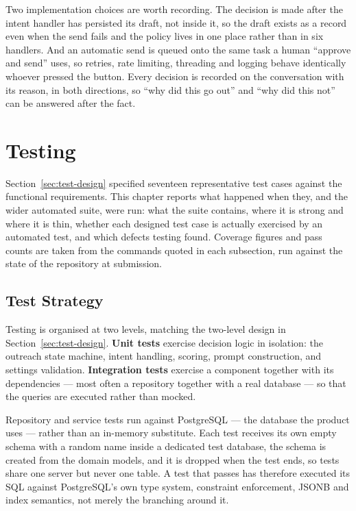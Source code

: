 \documentclass[a4paper]{article}
\begin{document}
Two implementation choices are worth recording. The decision is made after the
intent handler has persisted its draft, not inside it, so the draft exists as a
record even when the send fails and the policy lives in one place rather than
in six handlers. And an automatic send is queued onto the same task a human
``approve and send'' uses, so retries, rate limiting, threading and logging
behave identically whoever pressed the button. Every decision is recorded on
the conversation with its reason, in both directions, so ``why did this go
out'' and ``why did this not'' can be answered after the fact.

\newpage
\section{Testing}
\label{ch:testing}

Section~\ref{sec:test-design} specified seventeen representative test cases
against the functional requirements. This chapter reports what happened when
they, and the wider automated suite, were run: what the suite contains, where
it is strong and where it is thin, whether each designed test case is actually
exercised by an automated test, and which defects testing found. Coverage
figures and pass counts are taken from the commands quoted in each subsection,
run against the state of the repository at submission.

\subsection{Test Strategy}

Testing is organised at two levels, matching the two-level design in
Section~\ref{sec:test-design}. \textbf{Unit tests} exercise decision logic in
isolation: the outreach state machine, intent handling, scoring, prompt
construction, and settings validation. \textbf{Integration tests} exercise a
component together with its dependencies --- most often a repository together
with a real database --- so that the queries are executed rather than mocked.

Repository and service tests run against PostgreSQL --- the database the
product uses --- rather than an in-memory substitute. Each test receives its own
empty schema with a random name inside a dedicated test database, the schema is
created from the domain models, and it is dropped when the test ends, so tests
share one server but never one table. A test that passes has therefore executed
its SQL against PostgreSQL's own type system, constraint enforcement, JSONB and
index semantics, not merely the branching around it.
\end{document}
